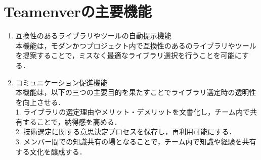 \documentclass[main]{subfiles}
\begin{document}
\section{Teamenverの主要機能}
\begin{enumerate}
\item 互換性のあるライブラリやツールの自動提示機能\\
本機能は，モダンかつプロジェクト内で互換性のあるのライブラリやツールを提案することで，ミスなく最適なライブラリ選択を行うことを可能にする．
\item コミュニケーション促進機能\\
本機能は，以下の三つの主要目的を果たすことでライブラリ選定時の透明性を向上させる．\\
1.	ライブラリの選定理由やメリット・デメリットを文書化し，チーム内で共有することで，納得感を高める．\\
2.	技術選定に関する意思決定プロセスを保存し，再利用可能にする．\\
3.	メンバー間での知識共有の場となることで，チーム内で知識や経験を共有する文化を醸成する．\\
\end{enumerate}
\end{document}
